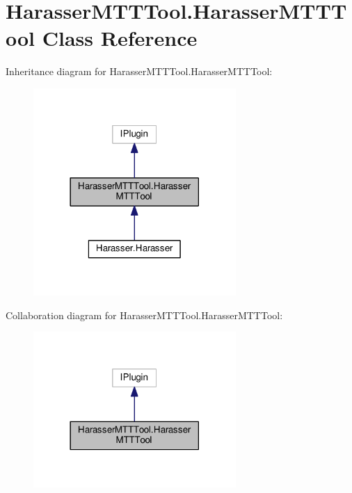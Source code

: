 \hypertarget{classHarasserMTTTool_1_1HarasserMTTTool}{\section{Harasser\-M\-T\-T\-Tool.\-Harasser\-M\-T\-T\-Tool Class Reference}
\label{classHarasserMTTTool_1_1HarasserMTTTool}
}


Inheritance diagram for Harasser\-M\-T\-T\-Tool.\-Harasser\-M\-T\-T\-Tool\-:
\nopagebreak
\begin{figure}[H]
\begin{center}
\leavevmode
\includegraphics[width=218pt]{classHarasserMTTTool_1_1HarasserMTTTool__inherit__graph}
\end{center}
\end{figure}


Collaboration diagram for Harasser\-M\-T\-T\-Tool.\-Harasser\-M\-T\-T\-Tool\-:
\nopagebreak
\begin{figure}[H]
\begin{center}
\leavevmode
\includegraphics[width=218pt]{classHarasserMTTTool_1_1HarasserMTTTool__coll__graph}
\end{center}
\end{figure}
